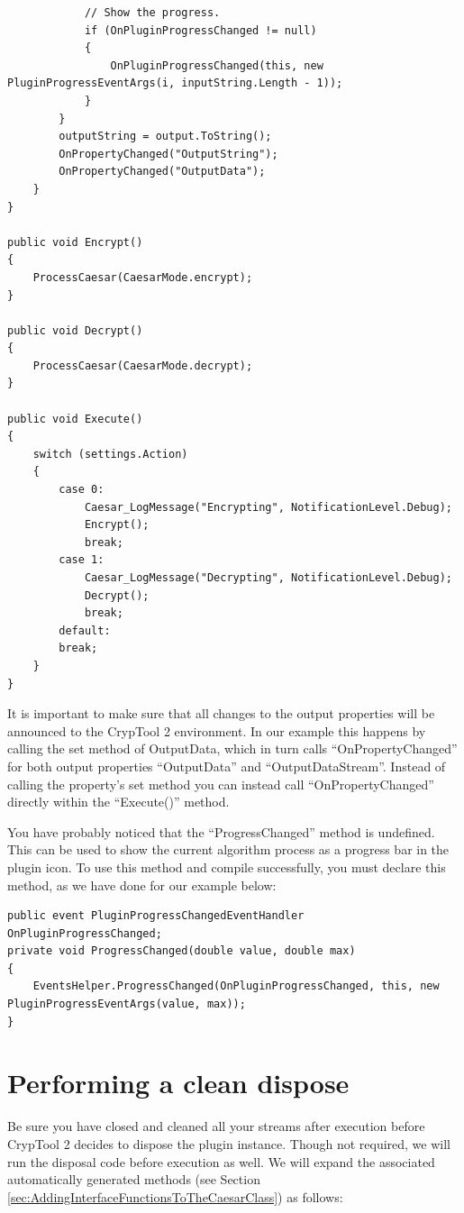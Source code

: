 \begin{lstlisting}
			// Show the progress.
			if (OnPluginProgressChanged != null)
			{
				OnPluginProgressChanged(this, new PluginProgressEventArgs(i, inputString.Length - 1));
			}
		}
		outputString = output.ToString();
		OnPropertyChanged("OutputString");
		OnPropertyChanged("OutputData");
	}
}

public void Encrypt()
{
	ProcessCaesar(CaesarMode.encrypt);
}

public void Decrypt()
{
	ProcessCaesar(CaesarMode.decrypt);
}

public void Execute()
{
	switch (settings.Action)
	{
		case 0:
			Caesar_LogMessage("Encrypting", NotificationLevel.Debug);
			Encrypt();
			break;
		case 1:
			Caesar_LogMessage("Decrypting", NotificationLevel.Debug);
			Decrypt();
			break;
		default:
    	break;
	}
}
\end{lstlisting}

It is important to make sure that all changes to the output properties will be announced to the CrypTool 2 environment. In our example this happens by calling the set method of OutputData, which in turn calls ``OnPropertyChanged'' for both output properties ``OutputData'' and ``OutputDataStream''. Instead of calling the property's set method you can instead call ``OnPropertyChanged'' directly within the ``Execute()'' method.\clearpage

You have probably noticed that the ``ProgressChanged'' method is undefined. This can be used to show the current algorithm process as a progress bar in the plugin icon. To use this method and compile successfully, you must declare this method, as we have done for our example below:

\begin{lstlisting}
public event PluginProgressChangedEventHandler OnPluginProgressChanged;
private void ProgressChanged(double value, double max)
{
	EventsHelper.ProgressChanged(OnPluginProgressChanged, this, new PluginProgressEventArgs(value, max));
}
\end{lstlisting}

\section{Performing a clean dispose}
\label{sec:PerformingACleanDispose}

Be sure you have closed and cleaned all your streams after execution before CrypTool 2 decides to dispose the plugin instance. Though not required, we will run the disposal code before execution as well. We will expand the associated automatically generated methods (see Section \ref{sec:AddingInterfaceFunctionsToTheCaesarClass}) as follows:

